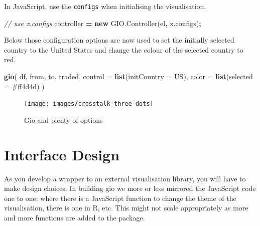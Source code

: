 \documentclass[
  10pt,
]{krantz}
\makeatletter
\newenvironment{Shaded}{\begin{snugshade}}{\end{snugshade}}
\newcommand{\AttributeTok}[1]{\textcolor[rgb]{0.61,0.61,0.61}{#1}}
\newcommand{\CommentTok}[1]{\textcolor[rgb]{0.37,0.37,0.37}{\textit{#1}}}
\newcommand{\DataTypeTok}[1]{\textcolor[rgb]{0.27,0.27,0.27}{#1}}
\newcommand{\KeywordTok}[1]{\textcolor[rgb]{0.27,0.27,0.27}{\textbf{#1}}}
\newcommand{\NormalTok}[1]{#1}
\newcommand{\OperatorTok}[1]{\textcolor[rgb]{0.43,0.43,0.43}{\textbf{#1}}}
\newcommand{\StringTok}[1]{\textcolor[rgb]{0.5,0.5,0.5}{#1}}
\newcommand{\VariableTok}[1]{\textcolor[rgb]{0,0,0}{#1}}
\newenvironment{kframe}{%
\medskip{}
\setlength{\fboxsep}{.8em}
 \def\at@end@of@kframe{}%
 \ifinner\ifhmode%
  \def\at@end@of@kframe{\end{minipage}}%
  \begin{minipage}{\columnwidth}%
 \fi\fi%
 \def\FrameCommand##1{\hskip\@totalleftmargin \hskip-\fboxsep
 \colorbox{shadecolor}{##1}\hskip-\fboxsep
     \hskip-\linewidth \hskip-\@totalleftmargin \hskip\columnwidth}%
 \MakeFramed {\advance\hsize-\width
   \@totalleftmargin\z@ \linewidth\hsize
   \@setminipage}}%
 {\par\unskip\endMakeFramed%
 \at@end@of@kframe}
\renewenvironment{Shaded}{\begin{kframe}}{\end{kframe}}
\makeatother
\begin{document}
In JavaScript, use the \texttt{configs} when initialising the visualisation.

\begin{Shaded}
\begin{Highlighting}[]
\CommentTok{// use x.configs}
\NormalTok{controller }\OperatorTok{=} \KeywordTok{new} \VariableTok{GIO}\NormalTok{.}\AttributeTok{Controller}\NormalTok{(el}\OperatorTok{,} \VariableTok{x}\NormalTok{.}\AttributeTok{configs}\NormalTok{)}\OperatorTok{;}
\end{Highlighting}
\end{Shaded}

Below those configuration options are now used to set the initially selected country to the United States and change the colour of the selected country to red.

\begin{Shaded}
\begin{Highlighting}[]
\KeywordTok{gio}\NormalTok{(}
\NormalTok{  df, from, to, traded, }
  \DataTypeTok{control =} \KeywordTok{list}\NormalTok{(}\DataTypeTok{initCountry =} \StringTok{\textquotesingle{}US\textquotesingle{}}\NormalTok{), }
  \DataTypeTok{color =} \KeywordTok{list}\NormalTok{(}\DataTypeTok{selected =} \StringTok{\textquotesingle{}\#ff4d4d\textquotesingle{}}\NormalTok{)}
\NormalTok{) }
\end{Highlighting}
\end{Shaded}

\begin{figure}[H]

{\centering \texttt{[image: images/crosstalk-three-dots]} 

}

\caption{Gio and plenty of options}\label{fig:crosstalk-three-dots}
\end{figure}

\hypertarget{widgets-final-interface}{%
\section{Interface Design}\label{widgets-final-interface}}

As you develop a wrapper to an external visualisation library, you will have to make design choices. In building gio we more or less mirrored the JavaScript code one to one: where there is a JavaScript function to change the theme of the visualisation, there is one in R, etc. This might not scale appropriately as more and more functions are added to the package.
\end{document}
